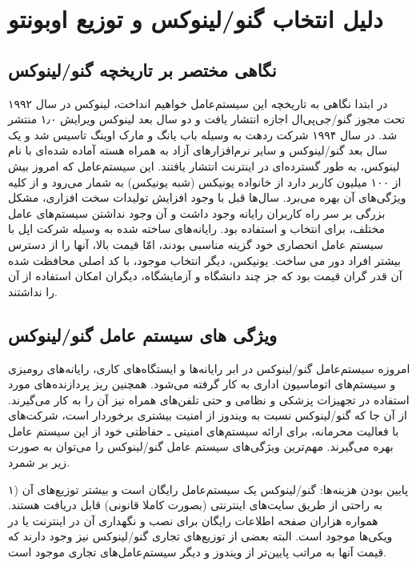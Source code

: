 \section{دلیل انتخاب گنو/لینوکس و توزیع اوبونتو}
\subsection{نگاهی مختصر بر تاریخچه گنو/لینوکس}
\label{SteganalysisIntro}

در ابتدا نگاهی به تاریخچه این سیستم‌عامل خواهیم انداخت، لینوکس در سال ۱۹۹۲ تحت مجوز گنو/جی‌پی‌ال اجازه انتشار یافت و دو سال بعد لینوکس ویرایش ۱٫۰ منتشر شد. در سال ۱۹۹۴ شرکت ردهت به وسیله باب یانگ 
 و مارک اوینگ 
  تاسیس شد و یک سال بعد گنو/لینوکس و سایر نرم‌افزارهای آزاد به همراه هسته آماده شده‌ای با نام لینوکس، به طور گسترده‌ای در اینترنت انتشار یافتند. این سیستم‌عامل که امروز بیش از ۱۰۰ میلیون کاربر دارد از خانواده یونیکس (شبه یونیکس) به شمار می‌رود و از کلیه ویژگی‌های آن بهره می‌برد. سال‌ها قبل با وجود افزایش تولیدات سخت افزاری، مشکل بزرگی بر سر راه کاربران رایانه وجود داشت و آن وجود نداشتن سیستم‌های عامل مختلف، برای انتخاب و استفاده بود. رایانه‌های ساخته شده به وسیله شرکت اپل با سیستم عامل انحصاری خود گزینه مناسبی بودند، امّا قیمت بالا، آنها را از دسترس بیشتر افراد دور می ساخت. یونیکس، دیگر انتخاب موجود، با کد اصلی محافظت شده آن قدر گران قیمت بود که جز چند دانشگاه و آزمایشگاه، دیگران امکان استفاده از آن را نداشتند.
\subsection{ویژگی های سیستم عامل گنو/لینوکس}
امروزه سیستم‌عامل گنو/لینوکس در ابر رایانه‌ها و ایستگاه‌های کاری، رایانه‌های رومیزی و سیستم‌های اتوماسیون اداری به کار گرفته می‌شود. همچنین ریز پردازنده‌های مورد استفاده در تجهیزات پزشکی و نظامی و حتی تلفن‌های همراه نیز آن را به کار می‌گیرند. از آن جا که گنو/لینوکس نسبت به ویندوز از امنیت بیشتری برخوردار است، شرکت‌های با فعالیت محرمانه، برای ارائه سیستم‌های امنیتی ـ حفاظتی خود از این سیستم عامل بهره می‌گیرند. مهم‌ترین ویژگی‌های سیستم عامل گنو/لینوکس را می‌توان به صورت زیر بر شمرد.

۱)  پایین بودن هزینه‌ها: گنو/لینوکس یک سیستم‌عامل رایگان است و بیشتر توزیع‌های آن به راحتی از طریق سایت‌های اینترنتی (بصورت کاملا قانونی) قابل دریافت هستند. همواره هزاران صفحه اطلاعات رایگان برای نصب و نگهداری آن در اینترنت یا در ویکی‌ها موجود است. البته بعضی از توزیع‌های تجاری گنو/لینوکس نیز وجود دارند که قیمت آنها به مراتب پایین‌تر از ویندوز و دیگر سیستم‌عامل‌های تجاری موجود است.

